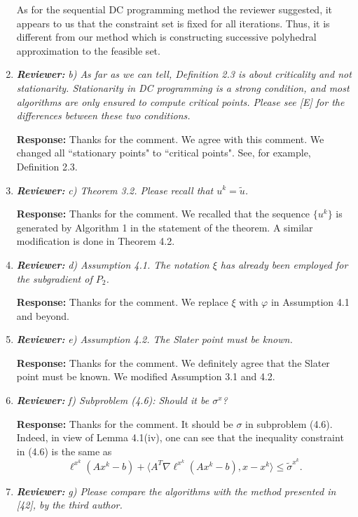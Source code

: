 \documentclass{article}
\begin{document}
\begin{enumerate}
    As for the sequential DC programming method the reviewer suggested, it appears to us that the constraint set is fixed for all iterations. Thus, it is different from our method which is constructing successive polyhedral approximation to the feasible set.
	
	\item \textit{\textbf{Reviewer:}} \textit{ b) As far as we can tell, Definition 2.3 is about criticality and not stationarity. Stationarity in DC programming is a strong condition, and most algorithms are only ensured to compute critical points. Please see [E] for the differences between these two conditions.}
	
	\textbf{Response:} Thanks for the comment. We agree with this comment. We changed all ``stationary points" to ``critical points". See, for example, Definition 2.3.
	
	\item  \textit{\textbf{Reviewer:}} \textit{ c) Theorem 3.2. Please recall that $u^k = \tilde u$.}
	
	\textbf{Response:} Thanks for the comment. We recalled that the sequence $\{u^k\}$ is generated by Algorithm 1 in the statement of the theorem. A similar modification is done in Theorem 4.2.

	\item \textit{\textbf{Reviewer:}} \textit{ d) Assumption 4.1. The notation $\xi$ has already been employed for the subgradient of $P_2$.}

    \textbf{Response:} Thanks for the comment. We replace $\xi$ with $\varphi$ in Assumption 4.1 and beyond.

	\item \textit{\textbf{Reviewer:}} \textit{ e) Assumption 4.2. The Slater point must be known.}

    \textbf{Response:} Thanks for the comment. We definitely agree that the Slater point must be known. We modified Assumption 3.1 and 4.2.

	\item \textit{\textbf{Reviewer:}} \textit{ f) Subproblem (4.6): Should it be $\sigma^x$?}

    \textbf{Response:} Thanks for the comment. It should be $\sigma$ in subproblem (4.6). Indeed, in view of Lemma 4.1(iv), one can see that the inequality constraint in (4.6) is the same as
    \[
    \ell^{x^k}(Ax^k - b) + \langle A^T\nabla \ell^{x^k}(Ax^k - b),x-x^k\rangle \le \tilde \sigma^{x^k}.
    \]

	\item \textit{\textbf{Reviewer:}} \textit{ g) Please compare the algorithms with the method presented in [42], by the third author.}


\end{enumerate}
\end{document}
